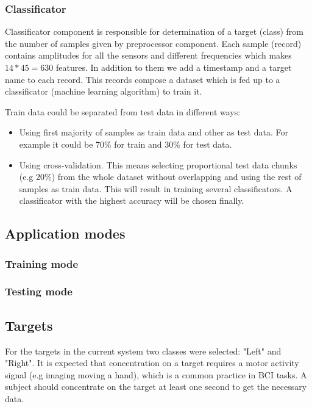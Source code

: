 \documentclass[12pt]{article}
\begin{document}
\subsubsection{Classificator}

Classificator component is responsible for determination of a target (class) from the number of samples given by preprocessor component. Each sample (record) contains amplitudes for all the sensors and different frequencies which makes $14*45=630$ features. In addition to them we add a timestamp and a target name to each record. This records compose a dataset which is fed up to a classificator (machine learning algorithm) to train it. 

Train data could be separated from test data in different ways:

\begin{itemize}
\item Using first majority of samples as train data and other as test data. For example it could be 70\% for train and 30\% for test data.
\item Using cross-validation. This means selecting proportional test data chunks (e.g 20\%) from the whole dataset without overlapping and using the rest of samples as train data. This will result in training several classificators. A classificator with the highest accuracy will be chosen finally.
\end{itemize}

\subsection{Application modes}
\subsubsection{Training mode}
\subsubsection{Testing mode}

\subsection{Targets}
For the targets in the current system two classes were selected: "Left" and "Right". It is expected that concentration on a target requires a motor activity signal (e.g imaging moving a hand), which is a common practice in BCI tasks. A subject should concentrate on the target at least one second to get the necessary data.
\end{document}
